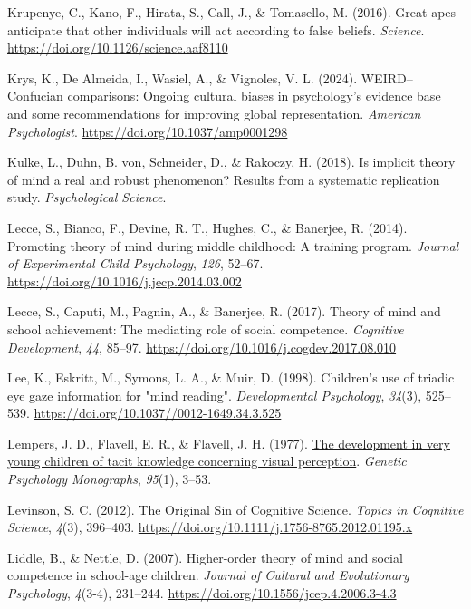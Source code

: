 \documentclass[
]{scrbook}
\newlength{\cslhangindent}
\newenvironment{CSLReferences}[2] %
 {\begin{list}{}{%
  \setlength{\itemindent}{0pt}
  \setlength{\leftmargin}{0pt}
  \setlength{\parsep}{0pt}
  \ifodd #1
   \setlength{\leftmargin}{\cslhangindent}
   \setlength{\itemindent}{-1\cslhangindent}
  \fi
  \setlength{\itemsep}{#2\baselineskip}}}
 {\end{list}}
\begin{document}
\begin{CSLReferences}{1}{0}
Krupenye, C., Kano, F., Hirata, S., Call, J., \& Tomasello, M. (2016). Great apes anticipate that other individuals will act according to false beliefs. \emph{Science}. \url{https://doi.org/10.1126/science.aaf8110}

Krys, K., De Almeida, I., Wasiel, A., \& Vignoles, V. L. (2024). {WEIRD}--{Confucian} comparisons: {Ongoing} cultural biases in psychology's evidence base and some recommendations for improving global representation. \emph{American Psychologist}. \url{https://doi.org/10.1037/amp0001298}

Kulke, L., Duhn, B. von, Schneider, D., \& Rakoczy, H. (2018). Is implicit theory of mind a real and robust phenomenon? {Results} from a systematic replication study. \emph{Psychological Science}.

Lecce, S., Bianco, F., Devine, R. T., Hughes, C., \& Banerjee, R. (2014). Promoting theory of mind during middle childhood: {A} training program. \emph{Journal of Experimental Child Psychology}, \emph{126}, 52--67. \url{https://doi.org/10.1016/j.jecp.2014.03.002}

Lecce, S., Caputi, M., Pagnin, A., \& Banerjee, R. (2017). Theory of mind and school achievement: {The} mediating role of social competence. \emph{Cognitive Development}, \emph{44}, 85--97. \url{https://doi.org/10.1016/j.cogdev.2017.08.010}

Lee, K., Eskritt, M., Symons, L. A., \& Muir, D. (1998). Children's use of triadic eye gaze information for "mind reading". \emph{Developmental Psychology}, \emph{34}(3), 525--539. \url{https://doi.org/10.1037//0012-1649.34.3.525}

Lempers, J. D., Flavell, E. R., \& Flavell, J. H. (1977). \href{https://www.ncbi.nlm.nih.gov/pubmed/849832}{The development in very young children of tacit knowledge concerning visual perception}. \emph{Genetic Psychology Monographs}, \emph{95}(1), 3--53.

Levinson, S. C. (2012). The {Original Sin} of {Cognitive Science}. \emph{Topics in Cognitive Science}, \emph{4}(3), 396--403. \url{https://doi.org/10.1111/j.1756-8765.2012.01195.x}

Liddle, B., \& Nettle, D. (2007). Higher-order theory of mind and social competence in school-age children. \emph{Journal of Cultural and Evolutionary Psychology}, \emph{4}(3-4), 231--244. \url{https://doi.org/10.1556/jcep.4.2006.3-4.3}


\end{CSLReferences}
\end{document}
